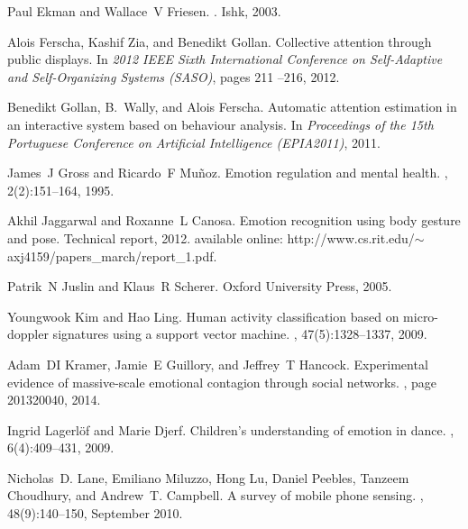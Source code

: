 \documentclass[12pt]{article}
\begin{document}
\begin{thebibliography}{10}
Paul Ekman and Wallace~V Friesen.
.
\newblock Ishk, 2003.

Alois Ferscha, Kashif Zia, and Benedikt Gollan.
\newblock Collective attention through public displays.
\newblock In {\em 2012 IEEE Sixth International Conference on Self-Adaptive and
  Self-Organizing Systems (SASO)}, pages 211 --216, 2012.

Benedikt Gollan, B.~Wally, and Alois Ferscha.
\newblock Automatic attention estimation in an interactive system based on
  behaviour analysis.
\newblock In {\em Proceedings of the 15th Portuguese Conference on Artificial
  Intelligence (EPIA2011)}, 2011.

James~J Gross and Ricardo~F Mu{\~n}oz.
\newblock Emotion regulation and mental health.
, 2(2):151--164, 1995.

Akhil Jaggarwal and Roxanne~L Canosa.
\newblock Emotion recognition using body gesture and pose.
\newblock Technical report, 2012.
\newblock available online:
  http://www.cs.rit.edu/$\sim$axj4159/papers\_march/report\_1.pdf.

Patrik~N Juslin and Klaus~R Scherer.
\newblock Oxford University Press, 2005.

Youngwook Kim and Hao Ling.
\newblock Human activity classification based on micro-doppler signatures using
  a support vector machine.
,
  47(5):1328--1337, 2009.

Adam~DI Kramer, Jamie~E Guillory, and Jeffrey~T Hancock.
\newblock Experimental evidence of massive-scale emotional contagion through
  social networks.
, page
  201320040, 2014.

Ingrid Lagerl{\"o}f and Marie Djerf.
\newblock Children's understanding of emotion in dance.
, 6(4):409--431,
  2009.

Nicholas~D. Lane, Emiliano Miluzzo, Hong Lu, Daniel Peebles, Tanzeem Choudhury,
  and Andrew~T. Campbell.
\newblock A survey of mobile phone sensing.
, 48(9):140--150, September 2010.


\end{thebibliography}
\end{document}
